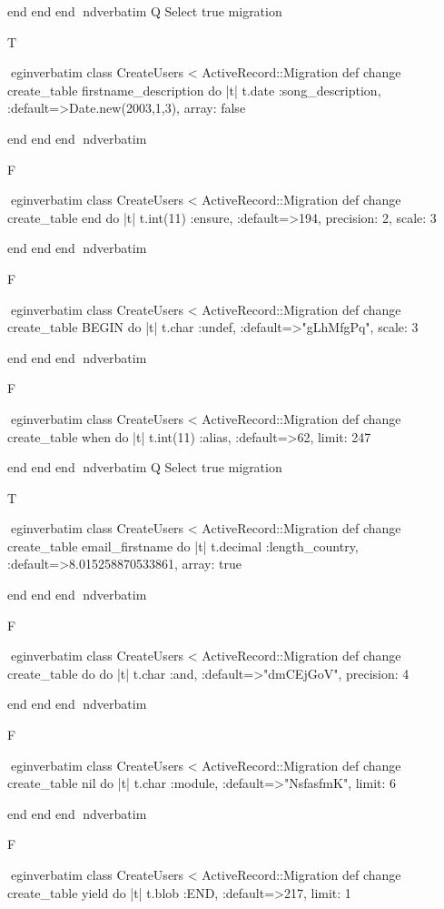     end 
  end 
end
nd{verbatim}
Q
 Select true migration

T

egin{verbatim}
 class CreateUsers < ActiveRecord::Migration 
  def change 
    create_table firstname_description do |t| 
      t.date :song_description, :default=>Date.new(2003,1,3), array: false
    
    end 
  end 
end
nd{verbatim}

F

egin{verbatim}
 class CreateUsers < ActiveRecord::Migration 
  def change 
    create_table end do |t| 
      t.int(11) :ensure, :default=>194, precision: 2, scale: 3
    
    end 
  end 
end
nd{verbatim}

F

egin{verbatim}
 class CreateUsers < ActiveRecord::Migration 
  def change 
    create_table BEGIN do |t| 
      t.char :undef, :default=>"gLhMfgPq", scale: 3
    
    end 
  end 
end
nd{verbatim}

F

egin{verbatim}
 class CreateUsers < ActiveRecord::Migration 
  def change 
    create_table when do |t| 
      t.int(11) :alias, :default=>62, limit: 247
    
    end 
  end 
end
nd{verbatim}
Q
 Select true migration

T

egin{verbatim}
 class CreateUsers < ActiveRecord::Migration 
  def change 
    create_table email_firstname do |t| 
      t.decimal :length_country, :default=>8.015258870533861, array: true
    
    end 
  end 
end
nd{verbatim}

F

egin{verbatim}
 class CreateUsers < ActiveRecord::Migration 
  def change 
    create_table do do |t| 
      t.char :and, :default=>"dmCEjGoV", precision: 4
    
    end 
  end 
end
nd{verbatim}

F

egin{verbatim}
 class CreateUsers < ActiveRecord::Migration 
  def change 
    create_table nil do |t| 
      t.char :module, :default=>"NsfasfmK", limit: 6
    
    end 
  end 
end
nd{verbatim}

F

egin{verbatim}
 class CreateUsers < ActiveRecord::Migration 
  def change 
    create_table yield do |t| 
      t.blob :END, :default=>217, limit: 1
    
